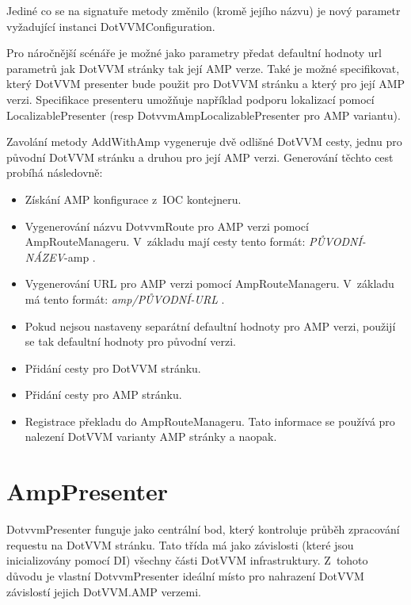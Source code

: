 Jediné co se na signatuře metody změnilo (kromě jejího názvu) je nový parametr vyžadující instanci DotVVMConfiguration.

Pro náročnější scénáře je možné jako parametry předat defaultní hodnoty url parametrů jak DotVVM stránky tak její AMP verze. Také je možné specifikovat, který DotVVM presenter bude použit pro DotVVM stránku a který pro její AMP verzi. Specifikace presenteru umožňuje například podporu lokalizací pomocí LocalizablePresenter (resp DotvvmAmpLocalizablePresenter pro AMP variantu).

Zavolání metody AddWithAmp vygeneruje dvě odlišné DotVVM cesty, jednu pro původní DotVVM stránku a druhou pro její AMP verzi.\newline
Generování těchto cest probíhá následovně:
\begin{itemize}
    \item Získání AMP konfigurace z~IOC kontejneru.
    \item Vygenerování názvu  DotvvmRoute pro AMP verzi pomocí AmpRouteManageru.\newline
    V~základu mají cesty tento formát: \textit{PŮVODNÍ-NÁZEV}-amp .
    \item Vygenerování URL  pro AMP verzi pomocí AmpRouteManageru.\newline
    V~základu má tento formát: \textit{amp/PŮVODNÍ-URL} .
    \item Pokud nejsou nastaveny separátní defaultní hodnoty pro AMP verzi, použijí se tak defaultní hodnoty pro původní verzi.
    \item Přidání cesty pro DotVVM stránku.
    \item Přidání cesty pro AMP stránku.
    \item Registrace překladu do AmpRouteManageru.\newline
    Tato informace se používá pro nalezení DotVVM varianty AMP stránky a naopak.
\end{itemize}

\section{AmpPresenter}
DotvvmPresenter funguje jako centrální bod, který kontroluje průběh zpracování requestu na DotVVM stránku. Tato třída má jako závislosti (které jsou inicializovány pomocí DI) všechny části DotVVM infrastruktury. Z~tohoto důvodu je vlastní DotvvmPresenter ideální místo pro nahrazení DotVVM závislostí jejich DotVVM.AMP verzemi.

